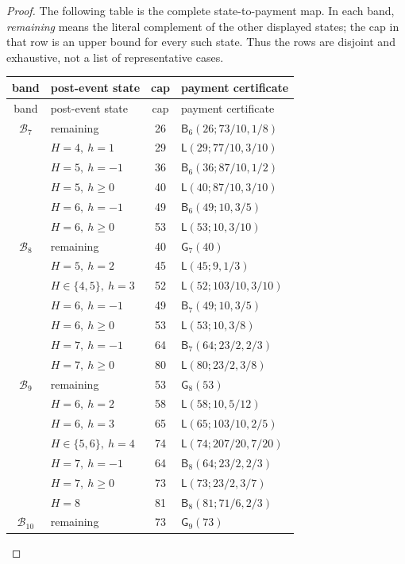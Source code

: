 \documentclass[11pt]{article}
\numberwithin{equation}{section}
\theoremstyle{definition}
\theoremstyle{remark}
\begin{document}
\begin{proof}
The following table is the complete state-to-payment map.  In each band,
\emph{remaining} means the literal complement of the other displayed
states; the cap in that row is an upper bound for every such state.  Thus
the rows are disjoint and exhaustive, not a list of representative cases.
\begingroup
\scriptsize
\renewcommand{\arraystretch}{1.12}
\begin{longtable}{@{}c p{5.8cm} c p{5.6cm}@{}}
\toprule
band&post-event state&cap&payment certificate\\
\midrule
\endfirsthead
\toprule
band&post-event state&cap&payment certificate\\
\midrule
\endhead
\(\mathcal B_7\)&remaining&26&\(\mathsf B_6(26;73/10,1/8)\)\\
&\(H=4,\ h=1\)&29&\(\mathsf L(29;77/10,3/10)\)\\
&\(H=5,\ h=-1\)&36&\(\mathsf B_6(36;87/10,1/2)\)\\
&\(H=5,\ h\geq0\)&40&\(\mathsf L(40;87/10,3/10)\)\\
&\(H=6,\ h=-1\)&49&\(\mathsf B_6(49;10,3/5)\)\\
&\(H=6,\ h\geq0\)&53&\(\mathsf L(53;10,3/10)\)\\
\midrule
\(\mathcal B_8\)&remaining&40&\(\mathsf G_7(40)\)\\
&\(H=5,\ h=2\)&45&\(\mathsf L(45;9,1/3)\)\\
&\(H\in\{4,5\},\ h=3\)&52&\(\mathsf L(52;103/10,3/10)\)\\
&\(H=6,\ h=-1\)&49&\(\mathsf B_7(49;10,3/5)\)\\
&\(H=6,\ h\geq0\)&53&\(\mathsf L(53;10,3/8)\)\\
&\(H=7,\ h=-1\)&64&\(\mathsf B_7(64;23/2,2/3)\)\\
&\(H=7,\ h\geq0\)&80&\(\mathsf L(80;23/2,3/8)\)\\
\midrule
\(\mathcal B_9\)&remaining&53&\(\mathsf G_8(53)\)\\
&\(H=6,\ h=2\)&58&\(\mathsf L(58;10,5/12)\)\\
&\(H=6,\ h=3\)&65&\(\mathsf L(65;103/10,2/5)\)\\
&\(H\in\{5,6\},\ h=4\)&74&\(\mathsf L(74;207/20,7/20)\)\\
&\(H=7,\ h=-1\)&64&\(\mathsf B_8(64;23/2,2/3)\)\\
&\(H=7,\ h\geq0\)&73&\(\mathsf L(73;23/2,3/7)\)\\
&\(H=8\)&81&\(\mathsf B_8(81;71/6,2/3)\)\\
\midrule
\(\mathcal B_{10}\)&remaining&73&\(\mathsf G_9(73)\)\\

\end{longtable}
\end{proof}
\end{document}
